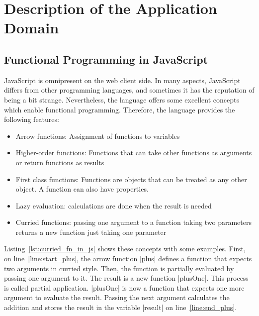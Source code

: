 \section{Description of the Application Domain}
\label{sec:Description of the Application Domain}
\subsection{Functional Programming in JavaScript}
\label{sub:Functional Programming in JavaScript}
JavaScript is omnipresent on the web client side. In many aspects, JavaScript
differs from other programming languages, and sometimes it has the reputation of
being a bit strange. Nevertheless, the language offers some excellent concepts
which enable functional programming. 
Therefore, the language provides the following features: 

\begin{itemize}
  \item{Arrow functions: Assignment of functions to variables} 
  \item{Higher-order functions: Functions that can take other functions as arguments or return functions as results}
  \item{First class functions: Functions are objects that can be treated as any
    other object. A function can also have
  properties.~\cite{mdn_functions_2023}}
  \item{Lazy evaluation: calculations are done when the result is needed}
  \item{Curried functions: passing one argument to a function taking two parameters returns a new function just taking one parameter}
\end{itemize}

Listing~\ref{lst:curried_fn_in_js} shows these concepts with some examples.
First, on line~\ref{line:start_plus}, the arrow function |plus| defines a function that expects two arguments in curried style.
Then, the function is partially evaluated by passing one argument to it. 
The result is a new function |plusOne|. This process is called partial application.
|plusOne| is now a function that expects one more argument
to evaluate the result. Passing the next argument calculates the addition and
stores the result in the variable |result| on line~\ref{line:end_plus}.
\\


